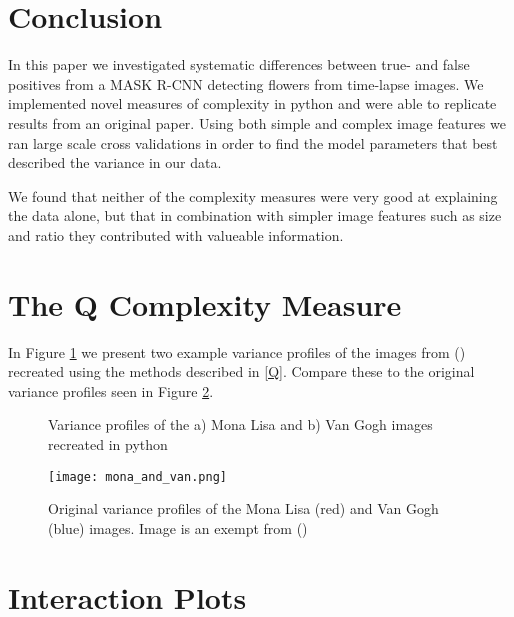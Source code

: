 \documentclass[12pt]{article}
\begin{document}
\section{Conclusion}
In this paper we investigated systematic differences between true- and false positives from a MASK R-CNN detecting flowers from time-lapse images. We implemented novel measures of complexity in python and were able to replicate results from an original paper. Using both simple and complex image features we ran large scale cross validations in order to find the model parameters that best described the variance in our data. 

We found that neither of the complexity measures were very good at explaining the data alone, but that in combination with simpler image features such as size and ratio they contributed with valueable information.

\clearpage

\appendix
\section{The Q Complexity Measure}\label{AQ}
In Figure \ref{fig:Qrecreated} we present two example variance profiles of the images from (\cite{zanetteQuantifyingComplexityBlackandwhite2018}) recreated using the methods described in \ref{Q}. Compare these to the original variance profiles seen in Figure \ref{fig:monalisa}.

\begin{figure}[h]
	\centering
	\hfill
	\caption{Variance profiles of the a) Mona Lisa and b) Van Gogh images recreated in python} 
	\label{fig:Qrecreated}
\end{figure}

\begin{figure}[h]
	\begin{center}
		\texttt{[image: mona\_and\_van.png]}
	\end{center}
	\caption{Original variance profiles of the Mona Lisa (red) and Van Gogh (blue) images. Image is an exempt from (\cite{zanetteQuantifyingComplexityBlackandwhite2018})}
	\label{fig:monalisa}
\end{figure}

\section{Interaction Plots}\label{Ainteraction}
\end{document}
